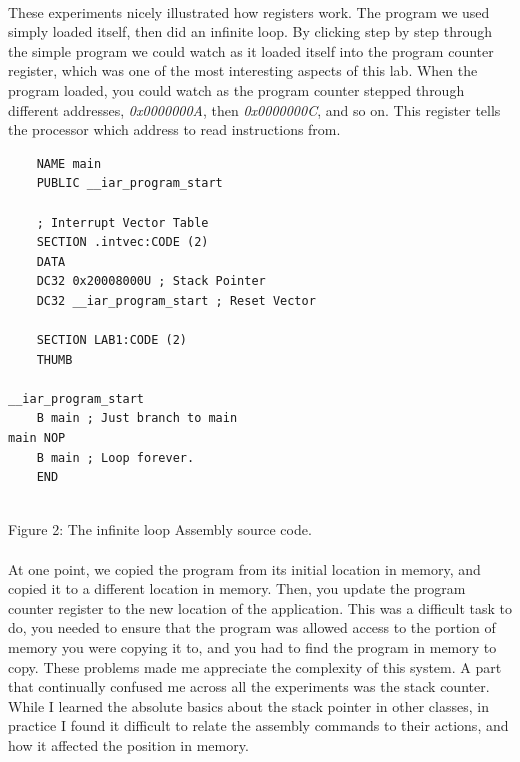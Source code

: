 \documentclass[12pt,a4paper,notitlepage]{report}
\begin{document}
\begin{normalsize}
	\paragraph*{}
	These experiments nicely illustrated how registers work. The program we used simply loaded itself, then did an infinite loop. By clicking step by step through the simple program we could watch as it loaded itself into the program counter register, which was one of the most interesting aspects of this lab. When the program loaded, you could watch as the program counter stepped through different addresses, \emph{0x0000000A}, then \emph{0x0000000C}, and so on. This register tells the processor which address to read instructions from. 
	
\pagebreak 
\lstset{language=[x86masm]Assembler}
\begin{lstlisting}
	NAME main
	PUBLIC __iar_program_start
	
	; Interrupt Vector Table
	SECTION .intvec:CODE (2)
	DATA
	DC32 0x20008000U ; Stack Pointer
	DC32 __iar_program_start ; Reset Vector
	
	SECTION LAB1:CODE (2)
	THUMB
	
__iar_program_start
	B main ; Just branch to main
main NOP
	B main ; Loop forever.
	END
		
\end{lstlisting}	
\begin{center}
\small{Figure 2: The infinite loop Assembly source code.}
\end{center}
	
	\paragraph*{}
	At one point, we copied the program from its initial location in memory, and copied it to a different location in memory. Then, you update the program counter register to the new location of the application. This was a difficult task to do, you needed to ensure that the program was allowed access to the portion of memory you were copying it to, and you had to find the program in memory to copy. These problems made me appreciate the complexity of this system. A part that continually confused me across all the experiments was the stack counter. While I learned the absolute basics about the stack pointer in other classes, in practice I found it difficult to relate the assembly commands to their actions, and how it affected the position in memory.

\end{normalsize}
\end{document}
